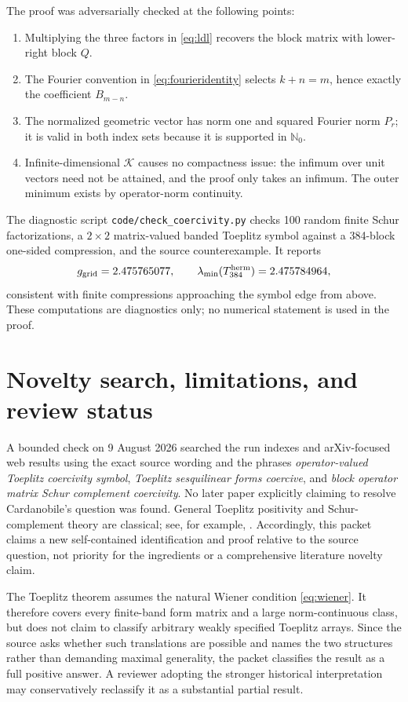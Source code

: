 \documentclass[11pt]{article}
\theoremstyle{definition}
\newcommand{\N}{\mathbb N_0}
\newcommand{\K}{\mathcal K}
\begin{document}
The proof was adversarially checked at the following points:
\begin{enumerate}[leftmargin=*]
\item Multiplying the three factors in \eqref{eq:ldl} recovers the block
matrix with lower-right block $Q$.
\item The Fourier convention in \eqref{eq:fourieridentity} selects
$k+n=m$, hence exactly the coefficient $B_{m-n}$.
\item The normalized geometric vector has norm one and squared Fourier norm
$P_r$; it is valid in both index sets because it is supported in $\N$.
\item Infinite-dimensional $\K$ causes no compactness issue: the infimum over
unit vectors need not be attained, and the proof only takes an infimum.  The
outer minimum exists by operator-norm continuity.
\end{enumerate}

The diagnostic script \texttt{code/check\_coercivity.py} checks 100 random
finite Schur factorizations, a $2\times2$ matrix-valued banded Toeplitz symbol
against a 384-block one-sided compression, and the source counterexample.  It
reports
\[
 g_{\rm grid}=2.475765077,\qquad
 \lambda_{\min}(T_{384}^{\rm herm})=2.475784964,
\]
consistent with finite compressions approaching the symbol edge from above.
These computations are diagnostics only; no numerical statement is used in
the proof.

\section{Novelty search, limitations, and review status}

A bounded check on 9 August 2026 searched the run indexes and arXiv-focused
web results using the exact source wording and the phrases
\emph{operator-valued Toeplitz coercivity symbol},
\emph{Toeplitz sesquilinear forms coercive}, and
\emph{block operator matrix Schur complement coercivity}.  No later paper
explicitly claiming to resolve Cardanobile's question was found.  General
Toeplitz positivity and Schur-complement theory are classical; see, for
example, \cite{BottcherSilbermann}.  Accordingly, this packet claims a new
self-contained identification and proof relative to the source question, not
priority for the ingredients or a comprehensive literature novelty claim.

The Toeplitz theorem assumes the natural Wiener condition
\eqref{eq:wiener}.  It therefore covers every finite-band form matrix and a
large norm-continuous class, but does not claim to classify arbitrary weakly
specified Toeplitz arrays.  Since the source asks whether such translations
are possible and names the two structures rather than demanding maximal
generality, the packet classifies the result as a full positive answer.  A
reviewer adopting the stronger historical interpretation may conservatively
reclassify it as a substantial partial result.
\end{document}
